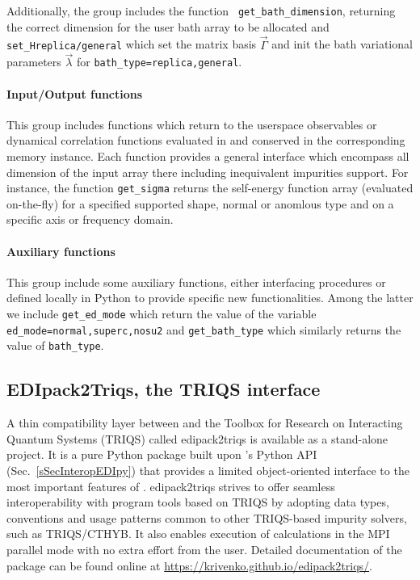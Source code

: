 \documentclass[edipack2.tex]{subfiles}
\begin{document}
Additionally, the group includes the function {\tt
  get\_bath\_dimension}, returning the correct
dimension for the user bath array to be allocated and {\tt
  set\_H{replica/general}} which set the matrix basis
$\vec{\Gamma}$ and init the bath variational parameters
$\vec{\lambda}$ for {\tt bath\_type=replica,general}. 




  
\paragraph{{\bf Input/Output functions}}
This group includes functions which return to the userspace
observables or dynamical correlation functions evaluated in \NAME and
conserved in the corresponding memory instance. Each function
provides a general interface which encompass all dimension of the
input array there including inequivalent impurities support.
For instance, the function {\tt get\_sigma} returns the self-energy
function array (evaluated on-the-fly) for a specified supported shape,
normal or anomlous type and on a specific axis or frequency domain. 
    

\paragraph{{\bf Auxiliary functions}}
This group include some auxiliary functions, either interfacing \NAME
procedures or defined locally in Python to provide specific new
functionalities. Among the latter we include {\tt get\_ed\_mode} which
return the value of the variable {\tt ed\_mode=normal,superc,nosu2}
and {\tt get\_bath\_type} which similarly returns the value of {\tt bath\_type}.









\subsection{EDIpack2Triqs, the TRIQS interface}\label{sSecInteropTRIQS}
A thin compatibility layer between \NAME and the Toolbox for Research on
Interacting Quantum Systems (TRIQS)\cite{Parcollet2015CPC} called edipack2triqs
is available as a stand-alone project. It is a pure Python package
built upon \NAME's Python API  (Sec.~\ref{sSecInteropEDIpy}) that provides a
limited object-oriented interface to the most important features of \NAME.
edipack2triqs strives to offer seamless interoperability with program tools
based on TRIQS by adopting data types, conventions and usage patterns
common to other TRIQS-based impurity solvers, such as
TRIQS/CTHYB\cite{Seth2016CPC}. It also enables execution of \NAME calculations
in the MPI parallel mode with no extra effort from the user.
Detailed documentation of the package can be 
found online at \href{https://krivenko.github.io/edipack2triqs/}
{https://krivenko.github.io/edipack2triqs/}.
\end{document}
